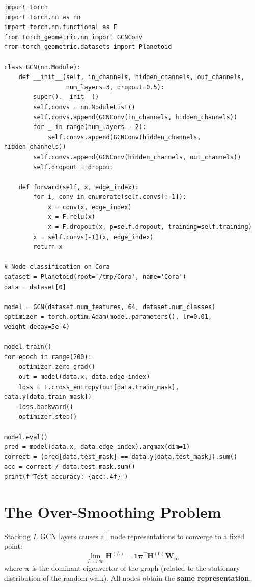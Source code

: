 \begin{codeblock}[title=\textbf{Complete GCN implementation}]
\begin{verbatim}
import torch
import torch.nn as nn
import torch.nn.functional as F
from torch_geometric.nn import GCNConv
from torch_geometric.datasets import Planetoid

class GCN(nn.Module):
    def __init__(self, in_channels, hidden_channels, out_channels,
                 num_layers=3, dropout=0.5):
        super().__init__()
        self.convs = nn.ModuleList()
        self.convs.append(GCNConv(in_channels, hidden_channels))
        for _ in range(num_layers - 2):
            self.convs.append(GCNConv(hidden_channels, hidden_channels))
        self.convs.append(GCNConv(hidden_channels, out_channels))
        self.dropout = dropout

    def forward(self, x, edge_index):
        for i, conv in enumerate(self.convs[:-1]):
            x = conv(x, edge_index)
            x = F.relu(x)
            x = F.dropout(x, p=self.dropout, training=self.training)
        x = self.convs[-1](x, edge_index)
        return x

# Node classification on Cora
dataset = Planetoid(root='/tmp/Cora', name='Cora')
data = dataset[0]

model = GCN(dataset.num_features, 64, dataset.num_classes)
optimizer = torch.optim.Adam(model.parameters(), lr=0.01, weight_decay=5e-4)

model.train()
for epoch in range(200):
    optimizer.zero_grad()
    out = model(data.x, data.edge_index)
    loss = F.cross_entropy(out[data.train_mask], data.y[data.train_mask])
    loss.backward()
    optimizer.step()

model.eval()
pred = model(data.x, data.edge_index).argmax(dim=1)
correct = (pred[data.test_mask] == data.y[data.test_mask]).sum()
acc = correct / data.test_mask.sum()
print(f"Test accuracy: {acc:.4f}")
\end{verbatim}
\end{codeblock}

\section{The Over-Smoothing Problem}

\begin{theorem}
Stacking $L$ GCN layers causes all node representations to converge to a
fixed point:
\[
    \lim_{L \to \infty} \mathbf{H}^{(L)} = \mathbf{1}\boldsymbol{\pi}^\top \mathbf{H}^{(0)} \mathbf{W}_\infty
\]
where $\boldsymbol{\pi}$ is the dominant eigenvector of the graph (related
to the stationary distribution of the random walk). All nodes obtain the
\textbf{same representation}.
\end{theorem}

